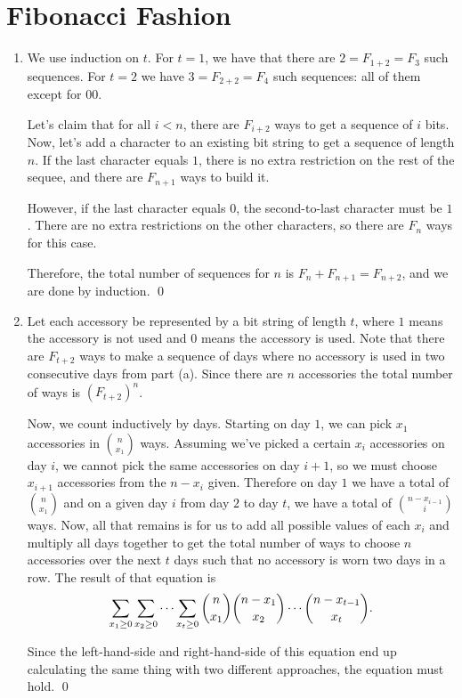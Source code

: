\documentclass{article}
\begin{document}
	\section{Fibonacci Fashion}
	\begin{enumerate}[label=\alph*)]
		\item We use induction on $t$. For $t = 1$, we have that there are $2 = F_{1+2} = F_3$
			such sequences. For $t = 2$ we have $3 = F_{2+2} = F_4$ such sequences: all of them
			except for $00$. 

			Let's claim that for all $i < n$, there are $F_{i+2}$ ways to get a sequence of $i$ 
			bits. Now, let's add a character to an existing bit string to get a sequence of 
			length $n$. If the last character equals $1$, there is no extra restriction on the 
			rest of the sequee, and there are $F_{n+1}$ ways to build it. 

			However, if the
			last character equals $0$, the second-to-last character must be $1$. There are 
			no extra restrictions on the other characters, so there are $F_n$ ways for this
			case.

			Therefore, the total number of sequences for $n$ is $F_n + F_{n+1} = F_{n+2}$, and
			we are done by induction. \qed
		\item Let each accessory be represented by a bit string of length $t$, where $1$ means
			the accessory is not used and $0$ means the accessory is used. Note that there
			are $F_{t+2}$ ways to make a sequence of days where no accessory is used in two
			consecutive days from part (a). Since there are $n$ accessories the total number
			of ways is $(F_{t+2})^n$. 

			Now, we count inductively by days. Starting on day $1$, we can pick $x_1$ accessories
			in $\binom{n}{x_1}$ ways. Assuming we've picked a certain $x_i$ accessories on day $i$,
			we cannot pick the same accessories on day $i+1$, so we must choose $x_{i+1}$ 
			accessories from the $n - x_i$ given. Therefore on day $1$ we have a total of 
			$\binom{n}{x_1}$ and on a given day $i$ from day $2$ to day $t$, we have a total
			of $\binom{n-x_{i-1}}{i}$ ways. Now, all that remains is for us to add all possible 
			values of each $x_i$ and multiply all days together to get the total number of ways
			to choose $n$ accessories over the next $t$ days such that no accessory is worn
			two days in a row. The result of that equation is
			\[\sum_{x_1 \geq 0} \sum_{x_2 \geq 0} \cdots \sum_{x_t \geq 0} \dbinom{n}{x_1} \dbinom{n - x_1}{x_2} \cdots \dbinom{n-x_{t-1}}{x_t}. \]

			Since the left-hand-side and right-hand-side of this equation end up calculating
			the same thing with two different approaches, the equation must hold. \qed
	\end{enumerate}
\end{document}
